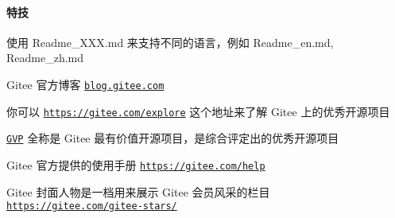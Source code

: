 \paragraph*{特技}


\begin{DoxyEnumerate}
\item 使用 Readme\+\_\+\+X\+X\+X.\+md 来支持不同的语言，例如 Readme\+\_\+en.\+md, Readme\+\_\+zh.\+md
\item Gitee 官方博客 \href{https://blog.gitee.com}{\tt blog.\+gitee.\+com}
\item 你可以 \href{https://gitee.com/explore}{\tt https\+://gitee.\+com/explore} 这个地址来了解 Gitee 上的优秀开源项目
\item \href{https://gitee.com/gvp}{\tt G\+VP} 全称是 Gitee 最有价值开源项目，是综合评定出的优秀开源项目
\item Gitee 官方提供的使用手册 \href{https://gitee.com/help}{\tt https\+://gitee.\+com/help}
\item Gitee 封面人物是一档用来展示 Gitee 会员风采的栏目 \href{https://gitee.com/gitee-stars/}{\tt https\+://gitee.\+com/gitee-\/stars/} 
\end{DoxyEnumerate}